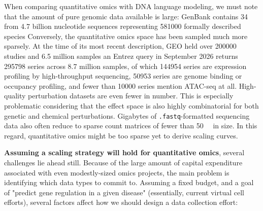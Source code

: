 When comparing quantitative omics with DNA language modeling, we must note that the amount of pure genomic data available is large: GenBank contains \SI{34}{\tera\bp} from 4.7 billion nucleotide sequences representing \num{581000} formally described species Conversely, the quantitative omics space has been sampled much more sparsely. At the time of its most recent description, GEO held over \num{200000} studies and 6.5 million samples an Entrez query in September 2026 returns \num{295798} series across 8.7 million samples, of which \num{144954} series are expression profiling by high-throughput sequencing, \num{50953} series are genome binding or occupancy profiling, and fewer than \num{10000} series mention ATAC-seq at all. High-quality perturbation datasets are even fewer in number. This is especially problematic considering that the effect space is also highly combinatorial for both genetic and chemical perturbations. Gigabytes of \verb|.fastq|-formatted sequencing data also often reduce to sparse count matrices of fewer than \SI{50}{\mega\byte} in size. In this regard, quantitative omics might be too sparse yet to derive scaling curves.

\textbf{Assuming a scaling strategy will hold for quantitative omics}, several challenges lie ahead still. Because of the large amount of capital expenditure associated with even modestly-sized omics projects, the main problem is identifying which data types to commit to. Assuming a fixed budget, and a goal of "predict gene regulation in a given disease" (essentially, current virtual cell efforts), several factors affect how we should design a data collection effort:

